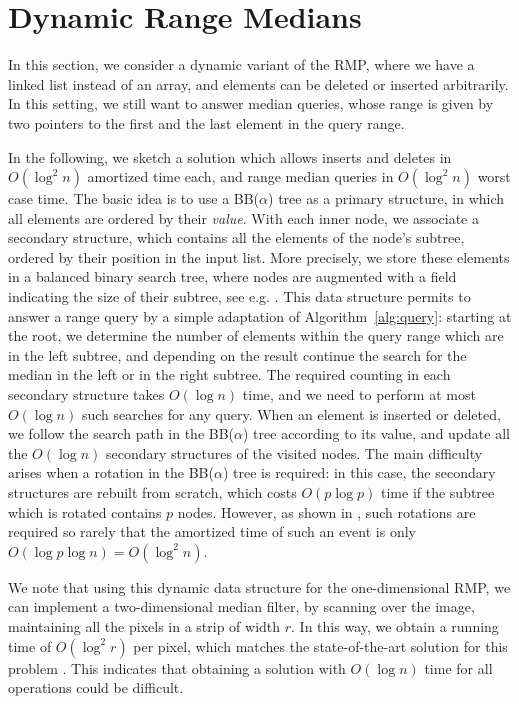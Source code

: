 \documentclass[a4paper,10pt]{article}
\begin{document}
\section{Dynamic Range Medians}
\label{s:dynamic}


In this section, we consider a dynamic variant of the RMP,
where we have a linked list instead of an array,
and elements can be deleted or inserted arbitrarily.
In this setting, we still want to answer median queries, whose range is given by two pointers to the first and the last
element in the query range. 

In the following, we sketch a solution which allows  inserts and deletes   in $O(\log^2 n)$ amortized time each, and range median queries in $O(\log^2 n)$ worst case time. 
The basic idea is to use a BB($\alpha$) tree \cite{DBLP:conf/stoc/NievergeltR72} as a primary structure, in which all elements are ordered by their \emph{value}.
With each inner node, we associate a secondary structure, which contains all the elements of the node's subtree, ordered by their position in the input list.
More precisely, we store these elements in a balanced binary search tree, where nodes are augmented with a field indicating the size of their subtree, see e.g. \cite{DBLP:conf/icalp/Roura01}. 
This data structure permits to answer a range query by a simple adaptation of Algorithm~\ref{alg:query}: starting at the root,
we determine the number of elements within the query range which are in the left subtree, and depending on the result continue the search for the median in the left or in the right subtree. The required counting in each secondary structure takes $O(\log n)$ time, and we need to perform at most $O(\log n)$ such searches for any query.
When an element is inserted or deleted, we follow the search path in the BB($\alpha$) tree according to its value, and update all the $O(\log n)$ secondary structures of the visited nodes. 
The main difficulty arises when a rotation in the BB($\alpha$) tree is required: in this case, the secondary structures are rebuilt from scratch, which costs $O(p\log p)$ time if the subtree which is rotated contains $p$ nodes. 
However, as shown in \cite{mehlhornsbook,luekerwillard}, such rotations are required so rarely that 
the amortized time of such an event is only $O(\log p \log n)=O(\log^2 n)$.


We note that using this dynamic data structure for the one-dimensional RMP, we can implement a two-dimensional median filter, by scanning over the image, maintaining all the pixels in a strip of width $r$. In this way, we obtain a running time of $O(\log^2 r)$ per pixel, which matches the state-of-the-art solution for this problem \cite{GilWerman}.
This indicates that obtaining a solution with $O(\log n)$ time for all operations could be difficult.
\end{document}
